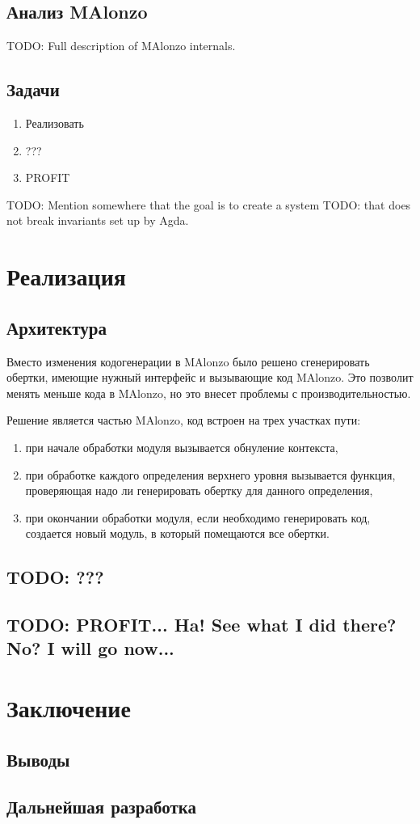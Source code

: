 \subsection{Анализ MAlonzo}

TODO: Full description of MAlonzo internals.

\subsection{Задачи}

\begin{enumerate}
\item Реализовать
\item ???
\item PROFIT
\end{enumerate}

TODO: Mention somewhere that the goal is to create a system
TODO: that does not break invariants set up by Agda.

\newpage
\section{Реализация}

\subsection{Архитектура}

Вместо изменения кодогенерации в MAlonzo было решено сгенерировать
обертки, имеющие нужный интерфейс и вызывающие код MAlonzo. Это
позволит менять меньше кода в MAlonzo, но это внесет проблемы с производительностью.

Решение является частью MAlonzo, код встроен на трех участках пути:
\begin{enumerate}
\item при начале обработки модуля вызывается обнуление контекста,
\item при обработке каждого определения верхнего уровня вызывается
      функция, проверяющая надо ли генерировать обертку для данного определения,
\item при окончании обработки модуля, если необходимо генерировать код, создается
      новый модуль, в который помещаются все обертки.
\end{enumerate}

\subsection{TODO: ???}

\subsection{TODO: PROFIT... Ha! See what I did there? No? I will go now...}

\newpage
\section{Заключение}

\subsection{Выводы}

\subsection{Дальнейшая разработка}
